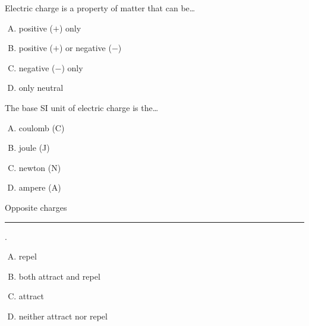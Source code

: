 \documentclass[14pt,t,dvipsnames]{beamer}
\begin{document}
\begin{frame}
Electric charge is a property of matter that can be\ldots


\begin{enumerate}[A.]
    \item positive ($+$) only
    \item \alert<2->{positive ($+$) or negative ($-$)}
    \item negative ($-$) only
    \item only neutral
\end{enumerate}
\end{frame}



\begin{frame}
The base SI unit of electric charge is the\ldots

\begin{enumerate}[A.]
    \item \alert<2->{coulomb (C)}
    \item joule (J)
    \item newton (N)
    \item ampere (A)
\end{enumerate}
\end{frame}

\begin{frame}
Opposite charges \rule{4cm}{0.4pt}.

\begin{center}
\end{center}

\begin{enumerate}[A.]
    \item repel
    \item both attract and repel
    \item \alert<2->{attract}
    \item neither attract nor repel
\end{enumerate}
\end{frame}
\end{document}
